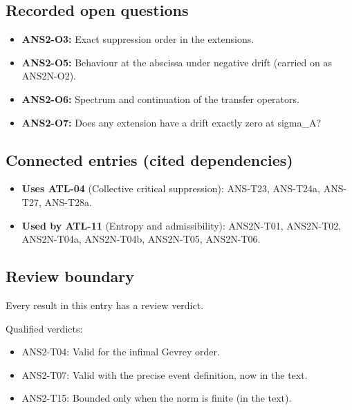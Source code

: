 \documentclass[
  11pt,
]{article}
\providecommand{\tightlist}{%
  \setlength{\itemsep}{0pt}\setlength{\parskip}{0pt}}
\begin{document}
\hypertarget{recorded-open-questions-8}{%
\subsection{Recorded open questions}\label{recorded-open-questions-8}}

\begin{itemize}
\tightlist
\item
  \textbf{ANS2-O3:} Exact suppression order in the extensions.
\item
  \textbf{ANS2-O5:} Behaviour at the abscissa under negative drift
  (carried on as ANS2N-O2).
\item
  \textbf{ANS2-O6:} Spectrum and continuation of the transfer operators.
\item
  \textbf{ANS2-O7:} Does any extension have a drift exactly zero at
  sigma\_A?
\end{itemize}

\hypertarget{connected-entries-cited-dependencies-9}{%
\subsection{Connected entries (cited
dependencies)}\label{connected-entries-cited-dependencies-9}}

\begin{itemize}
\tightlist
\item
  \textbf{Uses ATL-04} (Collective critical suppression): ANS-T23,
  ANS-T24a, ANS-T27, ANS-T28a.
\item
  \textbf{Used by ATL-11} (Entropy and admissibility): ANS2N-T01,
  ANS2N-T02, ANS2N-T04a, ANS2N-T04b, ANS2N-T05, ANS2N-T06.
\end{itemize}

\hypertarget{review-boundary-9}{%
\subsection{Review boundary}\label{review-boundary-9}}

Every result in this entry has a review verdict.

Qualified verdicts:

\begin{itemize}
\tightlist
\item
  ANS2-T04: Valid for the infimal Gevrey order.
\item
  ANS2-T07: Valid with the precise event definition, now in the text.
\item
  ANS2-T15: Bounded only when the norm is finite (in the text).
\end{itemize}
\end{document}
